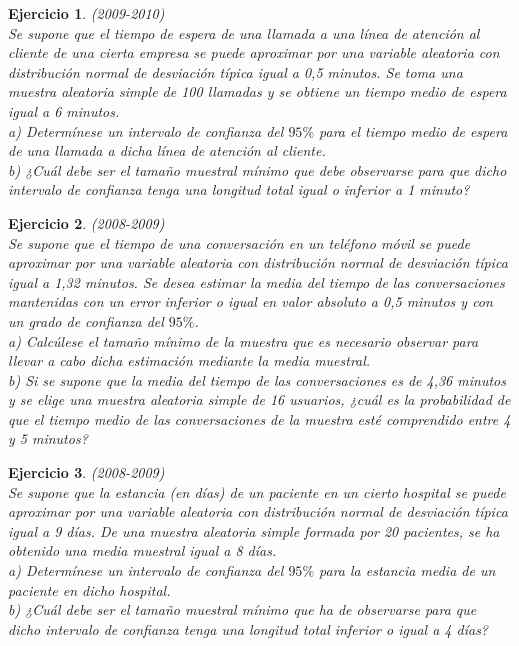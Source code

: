 \documentclass[12pt, a4paper]{amsart}
\newtheorem{ejer}{Ejercicio}
\begin{document}
\begin{ejer}\em (2009-2010)\\
Se supone que el tiempo de espera de una llamada a una línea de atención al cliente de una cierta
empresa se puede aproximar por una variable aleatoria con distribución normal de desviación
típica igual a 0,5 minutos. Se toma una muestra aleatoria simple de 100 llamadas y se obtiene
un tiempo medio de espera igual a 6 minutos.\\
a) Determínese un intervalo de confianza del $95\%$ para el tiempo medio de espera de una llamada
a dicha línea de atención al cliente.\\
b) ¿Cuál debe ser el tamaño muestral mínimo que debe observarse para que dicho intervalo de
confianza tenga una longitud total igual o inferior a 1 minuto?
\end{ejer}

\begin{ejer}\em (2008-2009)\\
Se supone que el tiempo de una conversación en un teléfono móvil se puede aproximar por una
variable aleatoria con distribución normal de desviación típica igual a 1,32 minutos. Se desea
estimar la media del tiempo de las conversaciones mantenidas con un error inferior o igual en
valor absoluto a 0,5 minutos y con un grado de confianza del $95\%$.\\
a) Calcúlese el tamaño mínimo de la muestra que es necesario observar para llevar a cabo dicha
estimación mediante la media muestral.\\
b) Si se supone que la media del tiempo de las conversaciones es de 4,36 minutos y se elige una
muestra aleatoria simple de 16 usuarios, ¿cuál es la probabilidad de que el tiempo medio de las
conversaciones de la muestra esté comprendido entre 4 y 5 minutos?
\end{ejer}

\begin{ejer}\em (2008-2009)\\
Se supone que la estancia (en días) de un paciente en un cierto hospital se puede aproximar
por una variable aleatoria con distribución normal de desviación típica igual a 9 días. De una
muestra aleatoria simple formada por 20 pacientes, se ha obtenido una media muestral igual a
8 días.\\
a) Determínese un intervalo de confianza del $95\%$ para la estancia media de un paciente en dicho
hospital.\\
b) ¿Cuál debe ser el tamaño muestral mínimo que ha de observarse para que dicho intervalo de
confianza tenga una longitud total inferior o igual a 4 días?
\end{ejer}
\end{document}
